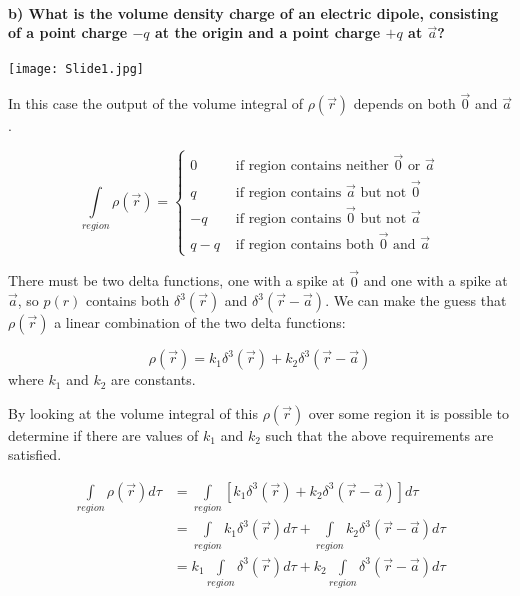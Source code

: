 \documentclass[12pt, oneside]{article}   	%
\begin{document}
\paragraph*{\textbf{b) What is the volume density charge of an electric dipole, consisting of a point charge $-q$ at the origin and a point charge $+q$ at $\vec{a}$?}}

\begin{center}
\texttt{[image: Slide1.jpg]}
\end{center}

In this case the output of the volume integral of $\rho({\vec{r}})$ depends on both $\vec{0}$ and $\vec{a}$. 

\[ \int\limits_{region}\rho(\vec{r})=\left\{\begin{array} {cl}
0 &\mbox{ if region contains neither }\vec{0} \mbox{ or }\vec{a}\\
q&\mbox{ if region contains }\vec{a}\mbox{ but not }\vec{0}\\
-q&\mbox{ if region contains }\vec{0}\mbox{ but not }\vec{a}\\
q-q&\mbox{ if region contains both }\vec{0} \mbox{ and }\vec{a}\end{array}\right.\]

There must be two delta functions, one with a spike at $\vec{0}$ and one with a spike at $\vec{a}$, so $p(r)$ contains both $\delta^3(\vec{r})$ and $\delta^3(\vec{r}-\vec{a})$. We can make the guess that $\rho({\vec{r}})$ a linear combination of the two delta functions:

\begin{equation}
\rho({\vec{r}}) =k_1\delta^3(\vec{r})+k_2\delta^3(\vec{r}-\vec{a})
\end{equation}
where $k_1$ and $k_2$ are constants.

By looking at the volume integral of this $\rho(\vec{r})$ over some region it is possible to determine if there are values of $k_1$ and $k_2$ such that the above requirements are satisfied.

\begin{equation}
\begin{split}
\int\limits_{region}\rho(\vec{r})d\tau&=\int\limits_{region}[k_1\delta^3(\vec{r})+k_2\delta^3(\vec{r}-\vec{a})]d\tau\\
&=\int\limits_{region}k_1\delta^3(\vec{r})d\tau+\int\limits_{region}k_2\delta^3(\vec{r}-\vec{a})d\tau\\
&=k_1\int\limits_{region}\delta^3(\vec{r})d\tau+k_2\int\limits_{region}\delta^3(\vec{r}-\vec{a})d\tau
\end{split}
\end{equation}
\end{document}
